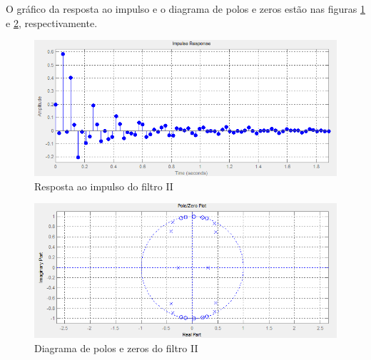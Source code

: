\documentclass[a4paper,10pt]{article}
\begin{document}
O gráfico da resposta ao impulso e o diagrama de polos e zeros estão nas figuras \ref{fig:resimp2} e \ref{fig:diapolozero2}, respectivamente.

\begin{figure}[ht]
 \centering
 \includegraphics[width=12cm]{pictures/Filtro2/RespImpulso.png}
 \caption{Resposta ao impulso do filtro II}
 \label{fig:resimp2}
\end{figure}

\begin{figure}[ht]
 \centering
 \includegraphics[width=12cm]{pictures/Filtro2/Polos&Zeros.png}
 \caption{Diagrama de polos e zeros do filtro II}
 \label{fig:diapolozero2}
\end{figure}
\end{document}
